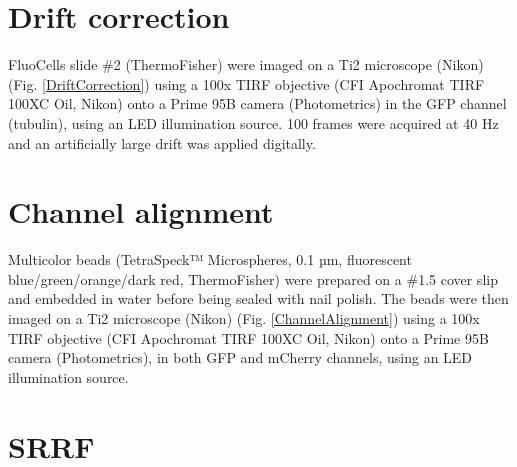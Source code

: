 

\onecolumn %
\fancyhead{} %
\renewcommand{\floatpagefraction}{0.1}
\lfoot[\bSupInf]{\dAuthor}
\rfoot[\dAuthor]{\cSupInf}
\newpage

\captionsetup*{format=largeformat} %
\setcounter{figure}{0} %
\setcounter{equation}{0} %
\setcounter{table}{0} %
\setcounter{page}{1} %
\makeatletter
\renewcommand{\thefigure}{S\@arabic\c@figure} %
\makeatother
\makeatletter
\renewcommand{\thetable}{S\@arabic\c@table} %
\makeatother
\makeatletter
\renewcommand{\theequation}{S\@arabic\c@equation} %
\makeatother




\tableofcontents

\newpage
\section{Drift correction}
FluoCells slide \#2 (ThermoFisher) were imaged on a Ti2 microscope (Nikon) (Fig. \ref{DriftCorrection}) using a 100x TIRF objective (CFI Apochromat TIRF 100XC Oil, Nikon) onto a Prime 95B camera (Photometrics) in the GFP channel (tubulin), using an LED illumination source. 100 frames were acquired at 40 Hz and an artificially large drift was applied digitally.


\section{Channel alignment}

Multicolor beads (TetraSpeck™ Microspheres, 0.1 µm, fluorescent blue/green/orange/dark red, ThermoFisher) were prepared on a \#1.5 cover slip and embedded in water before being sealed with nail polish. The beads were then imaged on a Ti2 microscope (Nikon) (Fig. \ref{ChannelAlignment}) using a 100x TIRF objective (CFI Apochromat TIRF 100XC Oil, Nikon) onto a Prime 95B camera (Photometrics), in both GFP and mCherry channels, using an LED illumination source. 

\section{SRRF}


